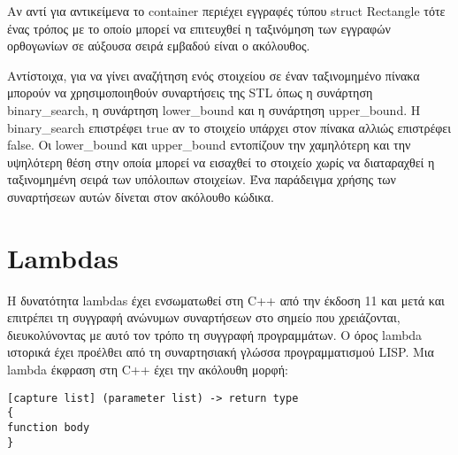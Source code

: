 





Αν αντί για αντικείμενα το container περιέχει εγγραφές τύπου struct Rectangle τότε ένας τρόπος με το οποίο μπορεί να επιτευχθεί η ταξινόμηση των εγγραφών ορθογωνίων σε αύξουσα σειρά εμβαδού είναι ο ακόλουθος.





Αντίστοιχα, για να γίνει αναζήτηση ενός στοιχείου σε έναν ταξινομημένο πίνακα μπορούν να χρησιμοποιηθούν συναρτήσεις της STL όπως η συνάρτηση binary\_search, η συνάρτηση lower\_bound και η συνάρτηση upper\_bound. H binary\_search επιστρέφει true αν το στοιχείο υπάρχει στον πίνακα αλλιώς επιστρέφει false. Οι lower\_bound και upper\_bound εντοπίζουν την χαμηλότερη και την υψηλότερη θέση στην οποία μπορεί να εισαχθεί το στοιχείο χωρίς να διαταραχθεί η ταξινομημένη σειρά των υπόλοιπων στοιχείων. Ένα παράδειγμα χρήσης των συναρτήσεων αυτών δίνεται στον ακόλουθο κώδικα.









\section{Lambdas}
Η δυνατότητα lambdas έχει ενσωματωθεί στη C++ από την έκδοση 11 και μετά και επιτρέπει τη συγγραφή ανώνυμων συναρτήσεων στο σημείο που χρειάζονται, διευκολύνοντας με αυτό τον τρόπο τη συγγραφή προγραμμάτων. O όρος lambda ιστορικά έχει προέλθει από τη συναρτησιακή γλώσσα προγραμματισμού LISP. Μια lambda έκφραση στη C++ έχει την ακόλουθη μορφή:

\begin{lstlisting}[style=DOS]
[capture list] (parameter list) -> return type 
{
function body
}
\end{lstlisting}

